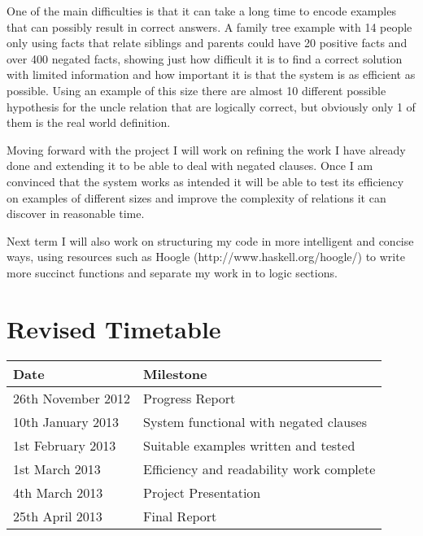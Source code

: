 \documentclass{article}
\begin{document}
One of the main difficulties is that it can take a long time to encode examples
that can possibly result in correct answers. A family tree example with 14
people only using facts that relate siblings and parents could have 20 positive
facts and over 400 negated facts, showing just how difficult it is to find a
correct solution with limited information and how important it is that the
system is as efficient as possible. Using an example of this size there are 
almost 10 different possible hypothesis for the uncle relation that are
logically correct, but obviously only 1 of them is the real world definition.

Moving forward with the project I will work on refining the work I have already
done and extending it to be able to deal with negated clauses. Once I am
convinced that the system works as intended it will be able to test its
efficiency on examples of different sizes and improve the complexity of relations
it can discover in reasonable time.

Next term I will also work on structuring my code in more intelligent and concise ways,
using resources such as Hoogle (http://www.haskell.org/hoogle/) to write more succinct
functions and separate my work in to logic sections.

\section*{Revised Timetable}

\begin{center}
    \begin{tabular}{|l|l|}
    \hline
    Date & Milestone \\
    \hline
    \rowcolor[gray]{0.9}
    26th November 2012 & Progress Report \\
    10th January 2013 & System functional with negated clauses \\
    1st February 2013 & Suitable examples written and tested \\
    1st March 2013 & Efficiency and readability work complete \\
    \rowcolor[gray]{0.9}
    4th March 2013 & Project Presentation \\
    \rowcolor[gray]{0.9}
    25th April 2013 & Final Report \\
    \hline
    \end{tabular}
\end{center}



\end{document}
